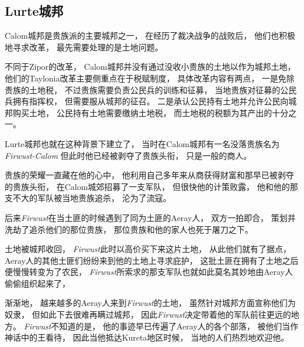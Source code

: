 \documentclass[UTF8,12pt,draft]{ctexbook}
\begin{document}
            \subsection{Lurte城邦}
                Calom城邦是贵族派的主要城邦之一，
                在经历了裁决战争的战败后，
                他们也积极地寻求改革，
                最先需要处理的是土地问题。

                不同于Zipor的改革，
                Calom城邦并没有通过没收小贵族的土地以作为城邦土地，
                他们的Taylonia改革主要侧重点在于税赋制度，
                具体改革内容有两点，
                一是免除贵族的土地税，
                不过贵族需要负责公民兵的训练和征募，
                当地贵族对征募的公民兵拥有指挥权，
                但需要服从城邦的征召。
                二是承认公民持有土地并允许公民向城邦购买土地，
                公民持有土地需要缴纳土地税，
                而土地税的税额为其产出的十分之一。

                Lurte城邦也就在这种背景下建立了，
                当时在Calom城邦有一名没落贵族名为\emph{Firwust-Calom}
                但此时他已经被剥夺了贵族头衔，
                只是一般的商人。

                贵族的荣耀一直藏在他的心中，
                他利用自己多年来从商获得财富和那早已被剥夺的贵族头衔，
                在Calom城郊招募了一支军队，
                但很快他的计策败露，
                他和他的那支不大的军队被当地贵族追杀，
                沦为了流寇。

                后来\emph{Firwust}在当土匪的时候遇到了同为土匪的Aeray人，
                双方一拍即合，
                策划并洗劫了追杀他们的那位贵族，
                那位贵族和他的家人也死于屠刀之下。

                土地被城邦收回，
                \emph{Firwust}此时以高价买下来这片土地，
                从此他们就有了据点，
                Aeray人的其他土匪们纷纷来到他的土地上寻求庇护，
                这批土匪在拥有了土地之后便慢慢转变为了农民，
                \emph{Firwust}所索求的那支军队也就如此莫名其妙地由Aeray人偷偷组织起来了，

                渐渐地，
                越来越多的Aeray人来到\emph{Firwust}的土地，
                虽然针对城邦方面宣称他们为奴隶，
                但如此下去很难再瞒过城邦，
                因此\emph{Firwust}决定带着他的军队前往更远的地方。
                \emph{Firwust}不知道的是，
                他的事迹早已传遍了Aeray人的各个部落，
                被他们当作神话中的王看待，
                因此当他抵达Kureta地区时候，
                当地的人们热烈地欢迎他。
\end{document}
